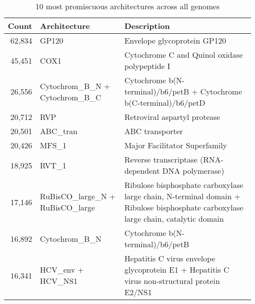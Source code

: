 \begin{table}
	\begin{center}
		\sf
		\begin{tabular}{r p{} p{}}
			\textbf{Count} & \textbf{Architecture} & \textbf{Description} \\
			\hline
			62,834 & GP120           & Envelope glycoprotein GP120                                         \\ 
			45,451 & COX1            & Cytochrome C and Quinol oxidase polypeptide I                       \\ 
			26,556 & Cytochrom\_B\_N + \newline Cytochrom\_B\_C & Cytochrome b(N-terminal)/b6/petB + \newline Cytochrome b(C-terminal)/b6/petD                                                              \\ 
			20,712 & RVP             & Retroviral aspartyl protease                                        \\ 
			20,501 & ABC\_tran        & ABC transporter                                                     \\ 
			20,426 & MFS\_1           & Major Facilitator Superfamily                                       \\ 
			18,925 & RVT\_1           & Reverse transcriptase (RNA-dependent DNA polymerase)                \\ 
			17,146 & RuBisCO\_large\_N + \newline RuBisCO\_large & Ribulose bisphosphate carboxylase large chain, N-terminal domain + \newline Ribulose bisphosphate carboxylase large chain, catalytic domain                                                              \\ 
			16,892 & Cytochrom\_B\_N & Cytochrome b(N-terminal)/b6/petB                                    \\ 
			16,341 & HCV\_env + HCV\_NS1 & Hepatitis C virus envelope glycoprotein E1 + \newline Hepatitis C virus non-structural protein E2/NS1\\ 
			\hline
		\end{tabular}
		\caption{10 most promiscuous architectures across all genomes}
	\end{center}
\end{table}


